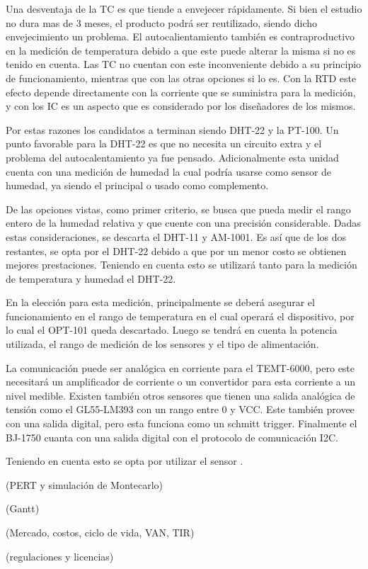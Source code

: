 Una desventaja de la TC es que tiende a envejecer rápidamente. Si bien el estudio no dura mas de 3 meses, el producto podrá ser reutilizado, siendo dicho envejecimiento un problema. El autocalientamiento también es contraproductivo en la medición de temperatura debido a que este puede alterar la misma si no es tenido en cuenta. Las TC no cuentan con este inconveniente debido a su principio de funcionamiento, mientras que con las otras opciones si lo es. Con la RTD este efecto depende directamente con la corriente que se suministra para la medición, y con los IC es un aspecto que es considerado por los diseñadores de los mismos.

Por estas razones los candidatos a terminan siendo DHT-22 y la PT-100. Un punto favorable para la DHT-22 es que no necesita un circuito extra y el problema del autocalentamiento ya fue pensado. Adicionalmente esta unidad cuenta con una medición de humedad la cual podría usarse como sensor de humedad, ya siendo el principal o usado como complemento.

De las opciones vistas, como primer criterio, se busca que pueda medir el rango entero de la humedad relativa y que cuente con una precisión considerable. Dadas estas consideraciones, se descarta el DHT-11 y AM-1001. Es así que de los dos restantes, se opta por el DHT-22 debido a que por un menor costo se obtienen mejores prestaciones. Teniendo en cuenta esto se utilizará tanto para la medición de temperatura y humedad el DHT-22.

En la elección para esta medición, principalmente se deberá asegurar el funcionamiento en el rango de temperatura en el cual operará el dispositivo, por lo cual el OPT-101 queda descartado. Luego se tendrá en cuenta la potencia utilizada, el rango de medición de los sensores y el tipo de alimentación.

La comunicación puede ser analógica en corriente para el TEMT-6000, pero este necesitará un amplificador de corriente o un convertidor para esta corriente a un nivel medible. Existen también otros sensores que tienen una salida analógica de tensión como el GL55-LM393 con un rango entre 0 y VCC. Este también provee con una salida digital, pero esta funciona como un schmitt trigger. Finalmente el BJ-1750 cuanta con una salida digital con el protocolo de comunicación I2C.

Teniendo en cuenta esto se opta por utilizar el sensor \TBD. 



(PERT y simulación de Montecarlo)

(Gantt)

(Mercado, costos, ciclo de vida, VAN, TIR)

(regulaciones y licencias)

